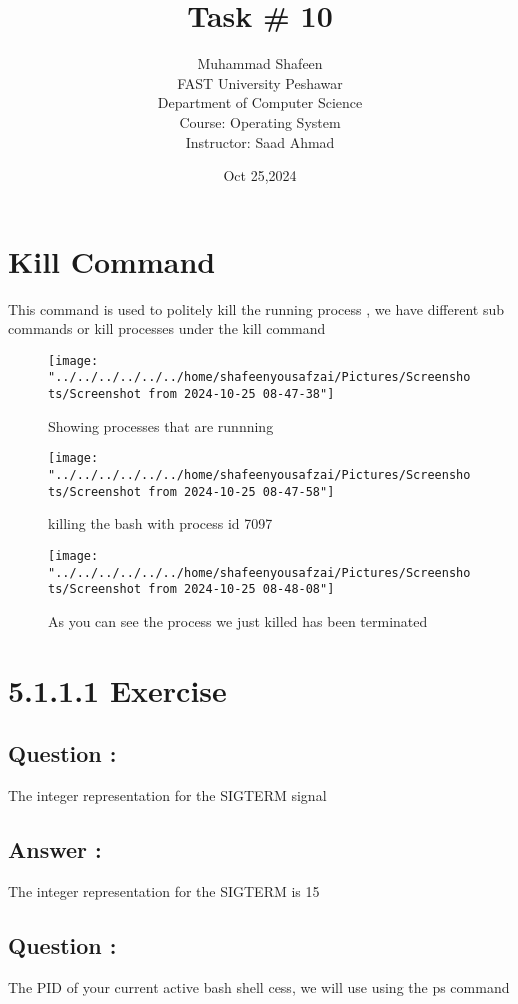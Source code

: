 \documentclass[12pt]{article}
\date{Oct 25,2024} %
\title{Task \# 10}
\author{Muhammad Shafeen\\
	FAST University Peshawar\\
	Department of Computer Science\\
	Course: Operating System\\
	Instructor: Saad Ahmad}
\begin{document}
	
	\section{Kill Command}
	This command is used to politely kill the running process , we have different sub commands or kill processes under the kill command


\begin{figure}[H]
	\centering
	\texttt{[image: "../../../../../../home/shafeenyousafzai/Pictures/Screenshots/Screenshot from 2024-10-25 08-47-38"]}
	\caption{Showing processes that are runnning }
	\label{fig:screenshot-from-2024-10-25-08-47-38}
\end{figure}
\begin{figure}[H]
	\centering
	\texttt{[image: "../../../../../../home/shafeenyousafzai/Pictures/Screenshots/Screenshot from 2024-10-25 08-47-58"]}
	\caption{killing the bash with process id {7097}}
	\label{fig:screenshot-from-2024-10-25-08-47-58}
\end{figure}
\begin{figure}[H]
	\centering
	\texttt{[image: "../../../../../../home/shafeenyousafzai/Pictures/Screenshots/Screenshot from 2024-10-25 08-48-08"]}
	\caption{As you can see the process we just killed has been terminated}
	\label{fig:screenshot-from-2024-10-25-08-48-08}
\end{figure}

\section{5.1.1.1 Exercise}
\subsection{Question : }
The integer representation for the SIGTERM signal		
\subsection{Answer : }
The integer representation for the SIGTERM is 15
\subsection{Question : }
The PID of your current active bash shell cess, we will use
using the ps command
\end{document}
